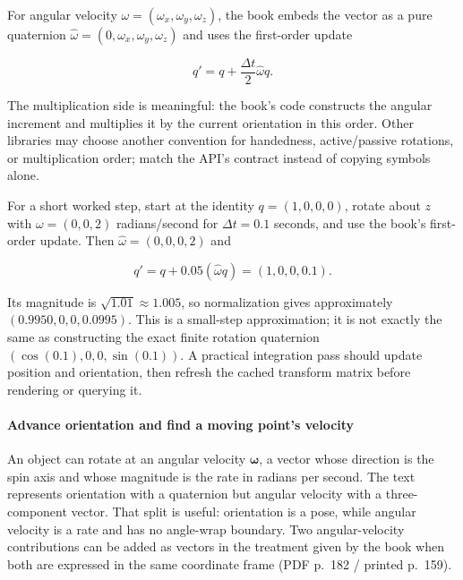 For angular velocity \(\omega=(\omega_x,\omega_y,\omega_z)\), the book embeds the vector as a pure quaternion \(\hat\omega=(0,\omega_x,\omega_y,\omega_z)\) and uses the first-order update

\[
q' = q+\frac{\Delta t}{2}\hat\omega q.
\]

The multiplication side is meaningful: the book's code constructs the angular increment and multiplies it by the current orientation in this order. Other libraries may choose another convention for handedness, active/passive rotations, or multiplication order; match the API's contract instead of copying symbols alone.

For a short worked step, start at the identity \(q=(1,0,0,0)\), rotate about \(z\) with \(\omega=(0,0,2)\) radians/second for \(\Delta t=0.1\) seconds, and use the book's first-order update. Then \(\hat\omega=(0,0,0,2)\) and

\[
q'=q+0.05(\hat\omega q)=(1,0,0,0.1).
\]

Its magnitude is \(\sqrt{1.01}\approx1.005\), so normalization gives approximately \((0.9950,0,0,0.0995)\). This is a small-step approximation; it is not exactly the same as constructing the exact finite rotation quaternion \(({\cos(0.1)},0,0,{\sin(0.1)})\). A practical integration pass should update position and orientation, then refresh the cached transform matrix before rendering or querying it.

\paragraph{Advance orientation and find a moving point's velocity}\label{06-engine-ii-ch025-advance-orientation-and-find-a-moving-points-velocity}

\hypertarget{06-engine-ii-ch025-advance-orientation-and-find-a-moving-points-velocity}{}

An object can rotate at an angular velocity \(\boldsymbol{\omega}\), a vector whose direction is the spin axis and whose magnitude is the rate in radians per second. The text represents orientation with a quaternion but angular velocity with a three-component vector. That split is useful: orientation is a pose, while angular velocity is a rate and has no angle-wrap boundary. Two angular-velocity contributions can be added as vectors in the treatment given by the book when both are expressed in the same coordinate frame (PDF p.~182 / printed p.~159).


